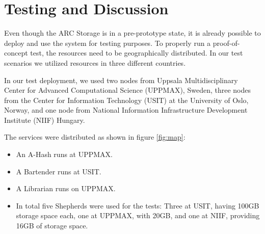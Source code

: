 \documentclass[final]{ieee}
\begin{document}
\section{Testing and Discussion}
\label{Testing and Discussion}

Even though the ARC Storage is in a pre-prototype state, it is already
possible to deploy and use the system for testing purposes. To
properly run a proof-of-concept test, the resources need to be
geographically distributed. In our test scenarios we utilized
resources in three different countries.

In our test deployment, we used two nodes from Uppsala
Multidisciplinary Center for Advanced Computational Science (UPPMAX), Sweden, 
three nodes from the Center for Information Technology (USIT) at the
University of Oslo, Norway, 
and one node from National Information Infrastructure Development Institute (NIIF)
Hungary. %

The services were distributed as shown in figure \ref{fig:map}:
\begin{itemize}
\item An A-Hash runs at UPPMAX.
\item A Bartender runs at USIT.
\item A Librarian runs on UPPMAX.
\item In total five Shepherds were used for the tests: Three at USIT, having
  100GB storage space each, one at UPPMAX, with 20GB, and one at NIIF, providing 16GB of storage space.
 \end{itemize}
\end{document}
